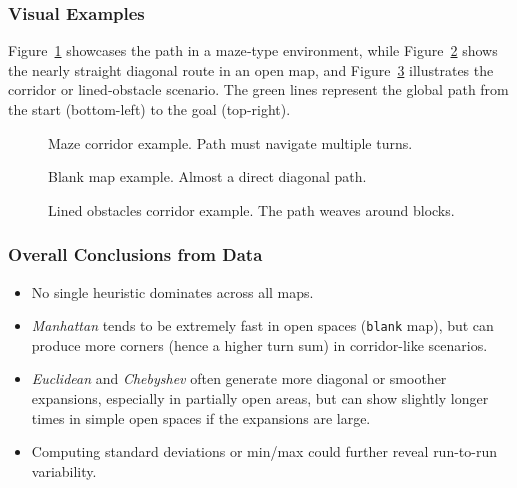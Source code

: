 \documentclass[letterpaper, 10 pt, conference]{ieeeconf}
\begin{document}
\subsubsection{Visual Examples}
Figure~\ref{fig:maze_paths} showcases the path in a maze‐type environment, while Figure~\ref{fig:blank_paths} shows the nearly straight diagonal route in an open map, and Figure~\ref{fig:lined_corridor_paths} illustrates the corridor or lined‐obstacle scenario. The green lines represent the global path from the start (bottom-left) to the goal (top-right).

\begin{figure}[!ht]
    \centering
    \caption{Maze corridor example. Path must navigate multiple turns.}
    \label{fig:maze_paths}
\end{figure}

\begin{figure}[!ht]
    \centering
    \caption{Blank map example. Almost a direct diagonal path.}
    \label{fig:blank_paths}
\end{figure}

\begin{figure}[!ht]
    \centering
    \caption{Lined obstacles corridor example. The path weaves around blocks.}
    \label{fig:lined_corridor_paths}
\end{figure}

\subsubsection{Overall Conclusions from Data}
\begin{itemize}
    \item No single heuristic dominates across all maps.
    \item \emph{Manhattan} tends to be extremely fast in open spaces (\texttt{blank} map), but can produce more corners (hence a higher turn sum) in corridor-like scenarios.
    \item \emph{Euclidean} and \emph{Chebyshev} often generate more diagonal or smoother expansions, especially in partially open areas, but can show slightly longer times in simple open spaces if the expansions are large.
    \item Computing standard deviations or min/max could further reveal run-to-run variability.
\end{itemize}
\end{document}
